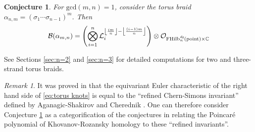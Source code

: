 \documentclass[12pt]{amsart}
\numberwithin{equation}{section}
\newtheorem{conjecture}[theorem]{Conjecture}
\theoremstyle{definition}
\theoremstyle{remark}
\newtheorem{remark}[theorem]{Remark}
\newcommand{\CC}{\mathbb{C}}
\newcommand{\CB}{\mathcal{B}}
\newcommand{\CL}{\mathcal{L}}
\newcommand{\CO}{\mathcal{O}}
\renewcommand{\1}{\mathbf{1}}
\newcommand{\FH}{\mathrm{FHilb}}
\newcommand{\point}{\mathrm{point}}
\newcommand{\SBim}{\mathrm{SBim}}
\newcommand{\edg}{\emph{dg}}
\begin{document}
\begin{conjecture}
\label{conj:torus knots}
For $\text{gcd}(m,n)=1$, consider the torus braid $\alpha_{n,m}=(\sigma_1\cdots\sigma_{n-1})^m$. Then
\begin{equation}
\label{eq:torus knots}
\CB(\alpha_{m,n}) = \left(\bigotimes_{i=1}^n \CL_i^{\left\lfloor\frac{im}{n}\right\rfloor-\left\lfloor\frac{(i-1)m}{n}\right\rfloor}\right) \otimes \CO_{\FH_n^\edg(\point)\times \CC}
\end{equation}
\end{conjecture}

See Sections \ref{sec:n=2} and \ref{sec:n=3} for detailed computations for two and three-strand torus braids.

\begin{remark}
It was proved in \cite{GN} that the equivariant Euler characteristic of the right hand side of \eqref{eq:torus knots} is equal to the ``refined Chern-Simons invariant'' defined by Aganagic-Shakirov \cite{AS} and Cherednik \cite{Ch}. One can therefore consider Conjecture \ref{conj:torus knots} as a categorification of the conjectures in \cite{AS,Ch} relating the Poincar\'e polynomial of Khovanov-Rozansky homology to these ``refined invariants''.
\end{remark}


\end{document}
